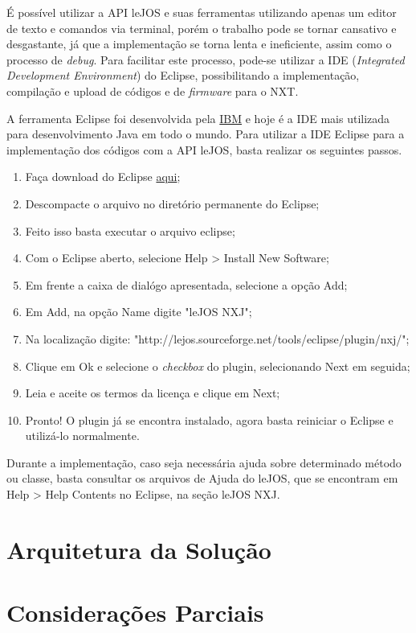 	É possível utilizar a API leJOS e suas ferramentas utilizando apenas um editor de texto e comandos via terminal, porém o trabalho pode se tornar cansativo e
	desgastante, já que a implementação se torna lenta e ineficiente, assim como o processo de \textit{debug}. Para facilitar este processo, pode-se utilizar
	a IDE (\textit{Integrated Development Environment}) do Eclipse, possibilitando a implementação, compilação e upload de códigos e de \textit{firmware} para o NXT.

	A ferramenta Eclipse foi desenvolvida pela \href{https://www.ibm.com/br-pt/}{IBM} e hoje é a IDE mais utilizada para desenvolvimento Java em todo o mundo.
	Para utilizar a IDE Eclipse para a implementação dos códigos com a API leJOS, basta realizar os seguintes passos.

	\begin{enumerate}
		\item Faça download do Eclipse \href{www.eclipse.org}{aqui};
		\item Descompacte o arquivo no diretório permanente do Eclipse;
		\item Feito isso basta executar o arquivo eclipse;
		\item Com o Eclipse aberto, selecione Help > Install New Software;
		\item Em frente a caixa de dialógo apresentada, selecione a opção Add;
		\item Em Add, na opção Name digite "leJOS NXJ";
		\item Na localização digite: "http://lejos.sourceforge.net/tools/eclipse/plugin/nxj/";
		\item Clique em Ok e selecione o \textit{checkbox} do plugin, selecionando Next em seguida;
		\item Leia e aceite os termos da licença e clique em Next;
		\item Pronto! O plugin já se encontra instalado, agora basta reiniciar o Eclipse e utilizá-lo normalmente.
	\end{enumerate}

	Durante a implementação, caso seja necessária ajuda sobre determinado método ou classe, basta consultar os arquivos de Ajuda do leJOS, que se encontram em
	Help > Help Contents no Eclipse, na seção leJOS NXJ.

\section{Arquitetura da Solução}

\section{Considerações Parciais}

